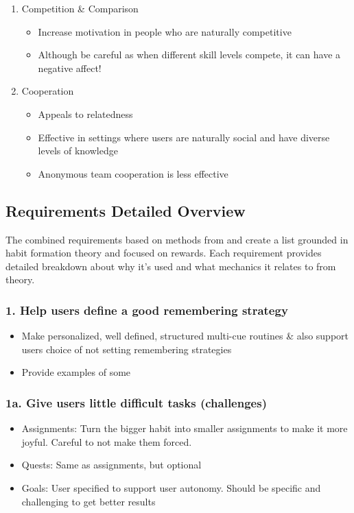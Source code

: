 \begin{enumerate}
      \item Competition \& Comparison
      \begin{itemize}
        \item Increase motivation in people who are naturally competitive
        \item Although be careful as when different skill levels compete, it can have a negative affect!
      \end{itemize}

      \item Cooperation
      \begin{itemize}
        \item Appeals to relatedness
        \item Effective in settings where users are naturally social and have diverse levels of knowledge
        \item Anonymous team cooperation is less effective
      \end{itemize}

    \end{enumerate}

\subsection{Requirements Detailed Overview}

The combined requirements based on methods from \cite{article_beyond_self_tracking_designing_apps} and \cite{article_taxonomy_motivational_affordances_meaningful} create a list grounded in habit formation theory and focused on rewards. Each requirement provides detailed breakdown about why it's used and what mechanics it relates to from theory.


\subsubsection*{1. Help users define a good remembering strategy}
  \begin{itemize}
    \item Make personalized, well defined, structured multi-cue routines \& also support users choice of not setting remembering strategies
    \item Provide examples of some
  \end{itemize}

\subsubsection*{1a. Give users little difficult tasks (challenges)}
  \begin{itemize}
    \item Assignments: Turn the bigger habit into smaller assignments to make it more joyful. Careful to not make them forced.
    \item Quests: Same as assignments, but optional
    \item Goals: User specified to support user autonomy. Should be specific and challenging to get better results
  \end{itemize}

